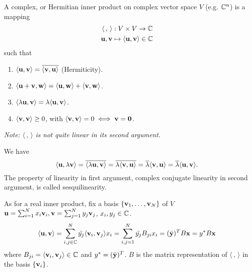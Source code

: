 \documentclass[10pt, a4paper]{article}
\begin{document}
\begin{definition}
    A complex,
    or Hermitian inner product on complex vector space $V$
    (e.g. $\mathbb{C} ^ n$)
    is a mapping
    \begin{align*}
        \langle\,,\,\rangle &: V \times V \rightarrow \mathbb{C} \\
        \mathbf{u}, \mathbf{v} &\mapsto \langle\mathbf{u}, \mathbf{v}\rangle \in \mathbb{C}
    \end{align*}
    such that
    \begin{enumerate}[label = (\roman*)]
        \item $\langle\mathbf{u}, \mathbf{v}\rangle = \overline{\langle\mathbf{v}, \mathbf{u}\rangle}$
        (Hermiticity).

        \item $\langle\mathbf{u} + \mathbf{v}, \mathbf{w}\rangle = \langle\mathbf{u}, \mathbf{w}\rangle + \langle\mathbf{v}, \mathbf{w}\rangle$.

        \item $\langle\lambda\mathbf{u}, \mathbf{v}\rangle = \lambda\langle\mathbf{u}, \mathbf{v}\rangle$.

        \item $\langle\mathbf{v}, \mathbf{v}\rangle \geq 0$,
        with $\langle\mathbf{v}, \mathbf{v}\rangle = 0 \iff \mathbf{v} = \mathbf{0}$.
    \end{enumerate}
\end{definition}
\textit{Note:
$\langle\,,\,\rangle$ is not quite linear in its second argument.}

We have
\[
\langle\mathbf{u}, \lambda\mathbf{v}\rangle = \overline{\langle\lambda\mathbf{u}, \mathbf{v}\rangle} = \overline{\lambda\langle\mathbf{v}, \mathbf{u}\rangle} = \overline{\lambda}\langle\mathbf{v}, \mathbf{u}\rangle = \overline{\lambda}\langle\mathbf{u}, \mathbf{v}\rangle.
\]
The property of linearity in first argument,
complex conjugate linearity in second argument,
is called sesquilinearity.


As for a real inner product,
fix a basis $\{\mathbf{v}_1, \dotsc, \mathbf{v}_N\}$ of $V$ $\mathbf{u} = \sum_{i = 1}^{N}x_i\mathbf{v}_i, \mathbf{v} = \sum_{j = 1}^{N}y_j\mathbf{v}_j$,
$x_i, y_j \in \mathbb{C}$.
\[
\langle \mathbf{u}, \mathbf{v}\rangle = \sum_{i, j \in \mathbb{C}}^{N}\Bar{y_j}\langle\mathbf{v}_i, \mathbf{v}_j\rangle x_i = \sum_{i, j = 1}^{N}\Bar{y_j}B_{ji}x_i = (\bar{\mathbf{y}}) ^ TB\mathbf{x} = y ^ {*}B\mathbf{x}
\]
where $B_{ji} = \langle\mathbf{v}_i, \mathbf{v}_j\rangle \in \mathbb{C}$ and $y ^ {*} = (\Bar{\mathbf{y}}) ^ T$.
$B$ is the matrix representation of $\langle\,,\,\rangle$ in the basis $\{\mathbf{v}_i\}$.
\end{document}
